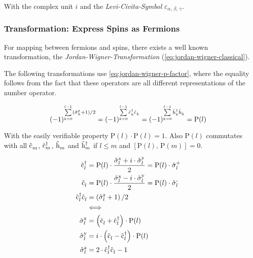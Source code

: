 With the complex unit $i$ and the \emph{Levi-Civita-Symbol} $\varepsilon_{\alpha,\,\beta,\,\gamma}$.

\subsubsection*{Transformation: Express Spins as Fermions}
For mapping between fermions and spins, there exists a well known transformation, the \emph{Jordan-Wigner-Transformation} \cite{jordanWignerBaseCase} (\autoref{eq:jordan-wigner-classical}).

The following transformations use \autoref{eq:jordan-wigner-p-factor}, where the equality follows from the fact that these operators are all different representations of the number operator.

\begin{equation}
    \label{eq:jordan-wigner-p-factor}
\left(-1\right)^{\sum\limits_{k=0}^{l-1} \left( \pauli[k]{z} +1 \right)/2 } = 
\left(-1\right)^{\sum\limits_{k=0}^{l-1}\cop{k}{\dagger}\cop{k}{} } =
\left(-1\right)^{\sum\limits_{k=0}^{l-1}\hop{k}{\dagger}\hop{k}{} } = 
\text{P}(l)
\end{equation}

With the easily verifiable property $\text{P}(l)\cdot \text{P}(l) = 1$. Also $\text{P}(l)$ commutates with all $\hat{\text{c}}^{ }_{m}$, $\hat{\text{c}}^{\dagger }_{m}$, $\hat{\text{h}}^{ }_{m}$ and $\hat{\text{h}}^{\dagger }_{m}$ if $l\leq m$ and $\left[\text{P}(l),\, \text{P}(m)\right] = 0$.

\begin{equation}
    \label{eq:jordan-wigner-classical}
    \begin{split}
        \cop{l}{\dagger} &= \text{P}(l) \cdot \frac{\pauli[l]{x} + i\cdot \pauli[l]{y}}{2} = \text{P}(l) \cdot \pauli[l]{+}\\
        \cop{l}{} &= \text{P}(l) \cdot \frac{\pauli[l]{x} - i\cdot \pauli[l]{y}}{2} = \text{P}(l) \cdot \pauli[l]{-}\\
        \cop{l}{\dagger}\cop{l}{} &= \left( \pauli[l]{z} +1 \right)/2\\
        &\Longleftrightarrow \\
        \pauli[l]{x} &= \left(\cop{l}{} + \cop{l}{\dagger}\right) \cdot \text{P}(l) \\
        \pauli[l]{y} &= i \cdot \left(\cop{l}{} - \cop{l}{\dagger}\right) \cdot \text{P}(l)\\
        \pauli[l]{z} &= 2 \cdot \cop{l}{\dagger}\cop{l}{} -1
    \end{split}
\end{equation}


